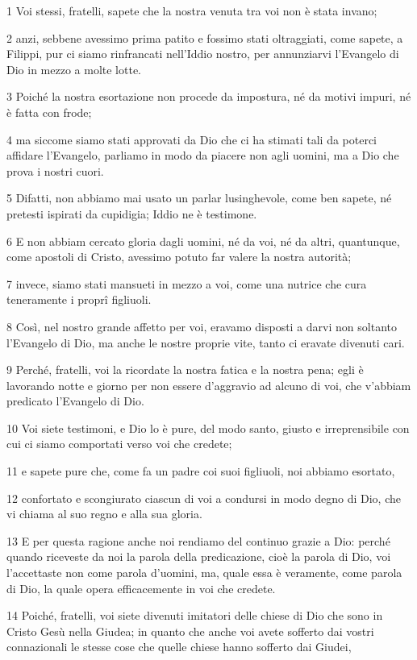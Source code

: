 \par 1 Voi stessi, fratelli, sapete che la nostra venuta tra voi non è stata invano;
\par 2 anzi, sebbene avessimo prima patito e fossimo stati oltraggiati, come sapete, a Filippi, pur ci siamo rinfrancati nell'Iddio nostro, per annunziarvi l'Evangelo di Dio in mezzo a molte lotte.
\par 3 Poiché la nostra esortazione non procede da impostura, né da motivi impuri, né è fatta con frode;
\par 4 ma siccome siamo stati approvati da Dio che ci ha stimati tali da poterci affidare l'Evangelo, parliamo in modo da piacere non agli uomini, ma a Dio che prova i nostri cuori.
\par 5 Difatti, non abbiamo mai usato un parlar lusinghevole, come ben sapete, né pretesti ispirati da cupidigia; Iddio ne è testimone.
\par 6 E non abbiam cercato gloria dagli uomini, né da voi, né da altri, quantunque, come apostoli di Cristo, avessimo potuto far valere la nostra autorità;
\par 7 invece, siamo stati mansueti in mezzo a voi, come una nutrice che cura teneramente i proprî figliuoli.
\par 8 Così, nel nostro grande affetto per voi, eravamo disposti a darvi non soltanto l'Evangelo di Dio, ma anche le nostre proprie vite, tanto ci eravate divenuti cari.
\par 9 Perché, fratelli, voi la ricordate la nostra fatica e la nostra pena; egli è lavorando notte e giorno per non essere d'aggravio ad alcuno di voi, che v'abbiam predicato l'Evangelo di Dio.
\par 10 Voi siete testimoni, e Dio lo è pure, del modo santo, giusto e irreprensibile con cui ci siamo comportati verso voi che credete;
\par 11 e sapete pure che, come fa un padre coi suoi figliuoli, noi abbiamo esortato,
\par 12 confortato e scongiurato ciascun di voi a condursi in modo degno di Dio, che vi chiama al suo regno e alla sua gloria.
\par 13 E per questa ragione anche noi rendiamo del continuo grazie a Dio: perché quando riceveste da noi la parola della predicazione, cioè la parola di Dio, voi l'accettaste non come parola d'uomini, ma, quale essa è veramente, come parola di Dio, la quale opera efficacemente in voi che credete.
\par 14 Poiché, fratelli, voi siete divenuti imitatori delle chiese di Dio che sono in Cristo Gesù nella Giudea; in quanto che anche voi avete sofferto dai vostri connazionali le stesse cose che quelle chiese hanno sofferto dai Giudei,
